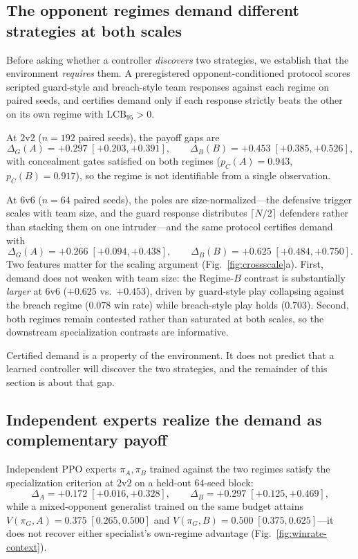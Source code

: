 \subsection{The opponent regimes demand different strategies at both scales}
\label{sec:results-demand}

Before asking whether a controller \emph{discovers} two strategies, we establish
that the environment \emph{requires} them. A preregistered opponent-conditioned
protocol scores scripted guard-style and breach-style team responses against each
regime on paired seeds, and certifies demand only if each response strictly beats
the other on its own regime with $\mathrm{LCB}_{95}>0$.

At $2$v$2$ ($n{=}192$ paired seeds), the payoff gaps are
\[
\Delta_G(A)=+0.297\;[+0.203,+0.391],
\qquad
\Delta_B(B)=+0.453\;[+0.385,+0.526],
\]
with concealment gates satisfied on both regimes ($p_C(A)=0.943$,
$p_C(B)=0.917$), so the regime is not identifiable from a single observation.

At $6$v$6$ ($n{=}64$ paired seeds), the poles are size-normalized---the defensive
trigger scales with team size, and the guard response distributes
$\lceil N/2 \rceil$ defenders rather than stacking them on one intruder---and the
same protocol certifies demand with
\[
\Delta_G(A)=+0.266\;[+0.094,+0.438],
\qquad
\Delta_B(B)=+0.625\;[+0.484,+0.750].
\]
Two features matter for the scaling argument (Fig.~\ref{fig:crossscale}a). First,
demand does not weaken with team size: the Regime-$B$ contrast is substantially
\emph{larger} at $6$v$6$ ($+0.625$ vs.\ $+0.453$), driven by guard-style play
collapsing against the breach regime ($0.078$ win rate) while breach-style play
holds ($0.703$). Second, both regimes remain contested rather than saturated at
both scales, so the downstream specialization contrasts are informative.

Certified demand is a property of the environment. It does not predict that a
learned controller will discover the two strategies, and the remainder of this
section is about that gap.

\subsection{Independent experts realize the demand as complementary payoff}
\label{sec:results-experts}

Independent PPO experts $\pi_A,\pi_B$ trained against the two regimes satisfy the
specialization criterion at $2$v$2$ on a held-out $64$-seed block:
\[
\Delta_A = +0.172\;[+0.016,+0.328],
\qquad
\Delta_B = +0.297\;[+0.125,+0.469],
\]
while a mixed-opponent generalist trained on the same budget attains
$V(\pi_G,A)=0.375\;[0.265,0.500]$ and $V(\pi_G,B)=0.500\;[0.375,0.625]$---it
does not recover either specialist's own-regime advantage
(Fig.~\ref{fig:winrate-context}).

